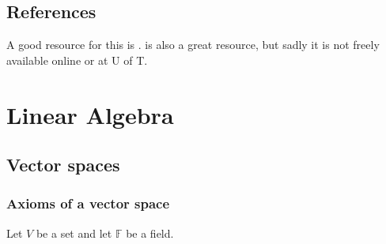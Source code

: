 \documentclass{article}
\begin{document}


%


\subsection{References}
A good resource for this is \textcite{proofs}. \textcite{toolsreasoning} is also a great resource, but sadly it is not freely available online or at U of T.




\section{Linear Algebra}

\subsection{Vector spaces}
\subsubsection{Axioms of a vector space}
Let $V$ be a set and let $\mathbb{F}$ be a field.
\end{document}
